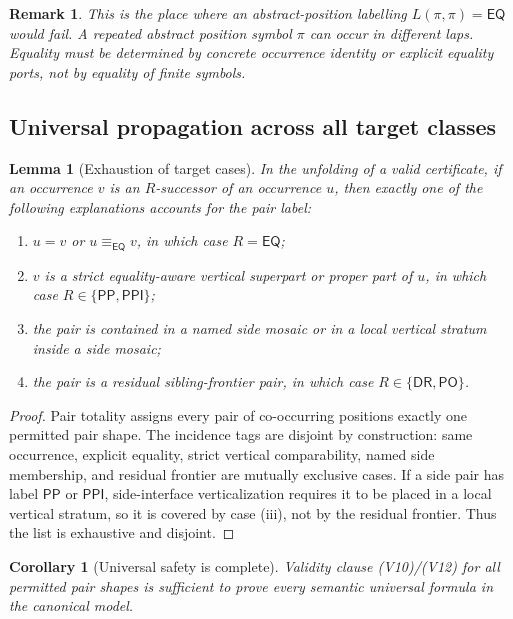\documentclass[11pt]{article}
\newtheorem{lemma}[theorem]{Lemma}
\newtheorem{corollary}[theorem]{Corollary}
\newtheorem{remark}[theorem]{Remark}
\newcommand{\EQ}{\mathsf{EQ}}
\newcommand{\DR}{\mathsf{DR}}
\newcommand{\PO}{\mathsf{PO}}
\newcommand{\PP}{\mathsf{PP}}
\newcommand{\PPI}{\mathsf{PPI}}
\newcommand{\eqc}{\equiv_{\EQ}}
\begin{document}
\begin{remark}
This is the place where an abstract-position labelling $L(\pi,\pi)=\EQ$ would fail.  A repeated abstract position symbol $\pi$ can occur in different laps.  Equality must be determined by concrete occurrence identity or explicit equality ports, not by equality of finite symbols.
\end{remark}

\subsection{Universal propagation across all target classes}

\begin{lemma}[Exhaustion of target cases]\label{lem:target-exhaustion}
In the unfolding of a valid certificate, if an occurrence $v$ is an $R$-successor of an occurrence $u$, then exactly one of the following explanations accounts for the pair label:
\begin{enumerate}[label=(\roman*)]
\item $u=v$ or $u\eqc v$, in which case $R=\EQ$;
\item $v$ is a strict equality-aware vertical superpart or proper part of $u$, in which case $R\in\{\PP,\PPI\}$;
\item the pair is contained in a named side mosaic or in a local vertical stratum inside a side mosaic;
\item the pair is a residual sibling-frontier pair, in which case $R\in\{\DR,\PO\}$.
\end{enumerate}
\end{lemma}

\begin{proof}
Pair totality assigns every pair of co-occurring positions exactly one permitted pair shape.  The incidence tags are disjoint by construction: same occurrence, explicit equality, strict vertical comparability, named side membership, and residual frontier are mutually exclusive cases.  If a side pair has label $\PP$ or $\PPI$, side-interface verticalization requires it to be placed in a local vertical stratum, so it is covered by case (iii), not by the residual frontier.  Thus the list is exhaustive and disjoint.
\end{proof}

\begin{corollary}[Universal safety is complete]\label{cor:universal-complete}
Validity clause (V10)/(V12) for all permitted pair shapes is sufficient to prove every semantic universal formula in the canonical model.
\end{corollary}
\end{document}
